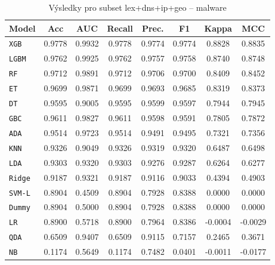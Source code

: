 \begin{table}[H]
  \centering
  \small
  \caption{Výsledky pro subset lex+dns+ip+geo – malware}
  \begin{tabular}{|l|c|c|c|c|c|c|c|}
    \hline
    \textbf{Model} & \textbf{Acc} & \textbf{AUC} & \textbf{Recall} & \textbf{Prec.} & \textbf{F1} & \textbf{Kappa} & \textbf{MCC} \\
    \hline
    \texttt{XGB} & 0.9778 & 0.9932 & 0.9778 & 0.9774 & 0.9774 & 0.8828 & 0.8835 \\
    \texttt{LGBM} & 0.9762 & 0.9925 & 0.9762 & 0.9757 & 0.9758 & 0.8740 & 0.8748 \\
    \texttt{RF} & 0.9712 & 0.9891 & 0.9712 & 0.9706 & 0.9700 & 0.8409 & 0.8452 \\
    \texttt{ET} & 0.9699 & 0.9871 & 0.9699 & 0.9693 & 0.9685 & 0.8319 & 0.8373 \\
    \texttt{DT} & 0.9595 & 0.9005 & 0.9595 & 0.9599 & 0.9597 & 0.7944 & 0.7945 \\
    \texttt{GBC} & 0.9611 & 0.9827 & 0.9611 & 0.9598 & 0.9591 & 0.7805 & 0.7872 \\
    \texttt{ADA} & 0.9514 & 0.9723 & 0.9514 & 0.9491 & 0.9495 & 0.7321 & 0.7356 \\
    \texttt{KNN} & 0.9326 & 0.9049 & 0.9326 & 0.9319 & 0.9320 & 0.6487 & 0.6498 \\
    \texttt{LDA} & 0.9303 & 0.9320 & 0.9303 & 0.9276 & 0.9287 & 0.6264 & 0.6277 \\
    \texttt{Ridge} & 0.9187 & 0.9321 & 0.9187 & 0.9116 & 0.9033 & 0.4394 & 0.4903 \\
    \texttt{SVM-L} & 0.8904 & 0.4509 & 0.8904 & 0.7928 & 0.8388 & 0.0000 & 0.0000 \\
    \texttt{Dummy} & 0.8904 & 0.5000 & 0.8904 & 0.7928 & 0.8388 & 0.0000 & 0.0000 \\
    \texttt{LR} & 0.8900 & 0.5718 & 0.8900 & 0.7964 & 0.8386 & -0.0004 & -0.0029 \\
    \texttt{QDA} & 0.6509 & 0.9407 & 0.6509 & 0.9115 & 0.7157 & 0.2465 & 0.3671 \\
    \texttt{NB} & 0.1174 & 0.5649 & 0.1174 & 0.7482 & 0.0401 & -0.0011 & -0.0177 \\
    \hline
  \end{tabular}
\end{table}
\vspace{0.5cm}

